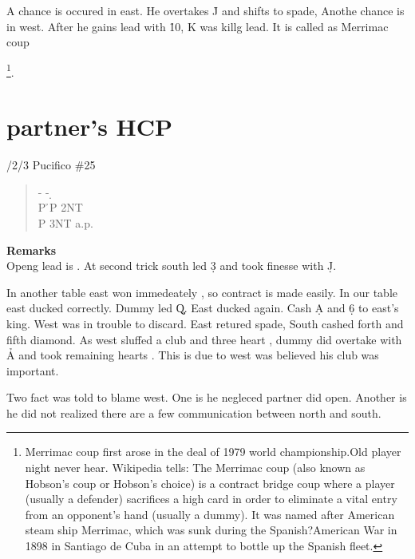 A chance is occured in east. He overtakes \h J and shifts to spade,
Anothe chance is in west. After he gains lead with \h 10, \s K was killg lead.
It is called as
Merrimac coup{\footnote{Merrimac coup first
 arose in the deal of 1979 
world championship.Old player night never hear. Wikipedia tells:
The Merrimac coup (also known as Hobson's coup or Hobson's choice) is a contract bridge coup where a player (usually a defender) sacrifices a high card in order to eliminate a vital entry from an opponent's hand (usually a dummy). It was named after American steam ship Merrimac, which was sunk during the Spanish?American War in 1898 in Santiago de Cuba in an attempt to bottle up the Spanish fleet.}.
%
\section{partner's HCP}
/2/3 Pucifico \#25
\begin{quote}
%
  {}%
  {}%
  {}%
  {}%
\end{quote}
\begin{quote}
\begin{bidding}
- \> - \d  {}\c \\
P \h \>P \> 2NT \\
P \> 3NT \>a.p. \\
 
\end{bidding}
 \end{quote}
{\bf Remarks}\\

Openg lead is . At second trick south led \d 3 and 
took finesse with \d J.

In another table east won immedeately , so contract is made easily.
In our table east ducked  correctly. Dummy led \c Q. East ducked again.
Cash \d A and \d 6 to east's king. West was in trouble to discard. 
East retured spade, South cashed forth and fifth diamond.
As west sluffed a club and three heart , dummy did overtake with \h A and took 
remaining hearts .
This is due to west was believed his club was important.

Two fact was told to blame west. One is he negleced partner did open.
Another is he did not realized there are a few communication between north 
and south.
}
